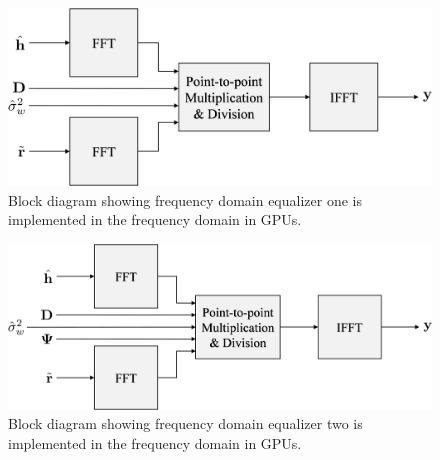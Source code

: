 \begin{figure}
	\centering\includegraphics[width=7.79in/100*55]{figures/eq_GPUimplementation/blockFDE1.pdf}
	\caption{Block diagram showing frequency domain equalizer one is implemented in the frequency domain in GPUs.}
	\label{fig:blockFDE1}
\end{figure}
\begin{figure}
	\centering\includegraphics[width=8.36in/100*55]{figures/eq_GPUimplementation/blockFDE2.pdf}
	\caption{Block diagram showing frequency domain equalizer two is implemented in the frequency domain in GPUs.}
	\label{fig:blockFDE2}
\end{figure}

